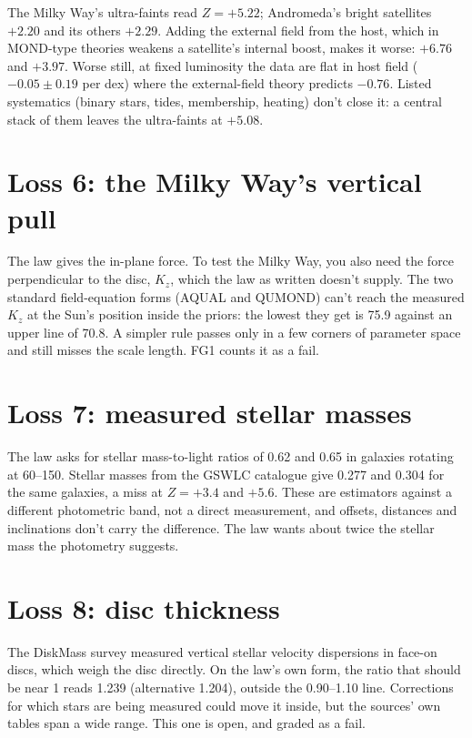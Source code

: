 The Milky Way's ultra-faints read $Z=+5.22$; Andromeda's bright satellites $+2.20$ and its others $+2.29$. Adding the external field from the host, which in MOND-type theories weakens a satellite's internal boost, makes it worse: $+6.76$ and $+3.97$. Worse still, at fixed luminosity the data are flat in host field ($-0.05\pm0.19$ per dex) where the external-field theory predicts $-0.76$. Listed systematics (binary stars, tides, membership, heating) don't close it: a central stack of them leaves the ultra-faints at $+5.08$.

\section{Loss 6: the Milky Way's vertical pull}

The law gives the in-plane force. To test the Milky Way, you also need the force perpendicular to the disc, $K_z$, which the law as written doesn't supply. The two standard field-equation forms (AQUAL and QUMOND) can't reach the measured $K_z$ at the Sun's position inside the priors: the lowest they get is 75.9 against an upper line of 70.8. A simpler rule passes only in a few corners of parameter space and still misses the scale length. FG1 counts it as a fail.

\section{Loss 7: measured stellar masses}

The law asks for stellar mass-to-light ratios of 0.62 and 0.65 in galaxies rotating at 60--150\kms. Stellar masses from the GSWLC catalogue give 0.277 and 0.304 for the same galaxies, a miss at $Z=+3.4$ and $+5.6$. These are estimators against a different photometric band, not a direct measurement, and offsets, distances and inclinations don't carry the difference. The law wants about twice the stellar mass the photometry suggests.




\section{Loss 8: disc thickness}

The DiskMass survey measured vertical stellar velocity dispersions in face-on discs, which weigh the disc directly. On the law's own form, the ratio that should be near 1 reads 1.239 (alternative 1.204), outside the 0.90--1.10 line. Corrections for which stars are being measured could move it inside, but the sources' own tables span a wide range. This one is open, and graded as a fail.

